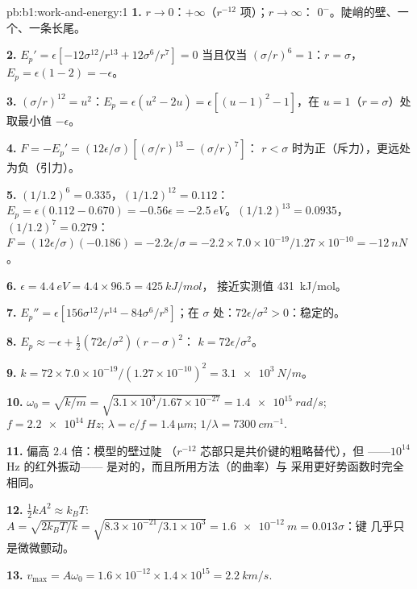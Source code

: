 \begin{solution}{pb:b1:work-and-energy:1}
\textbf{1.} $r \to 0$：$+\infty$（$r^{-12}$ 项）；$r \to \infty$：
$0^-$。陡峭的壁、一个、一条长尾。

\textbf{2.} $E_p' = \epsilon[-12\sigma^{12}/r^{13} + 12\sigma^6/r^7] = 0$ 当且仅当
$(\sigma/r)^6 = 1$：$r = \sigma$，$E_p = \epsilon(1 - 2) = -\epsilon$。

\textbf{3.} $(\sigma/r)^{12} = u^2$：$E_p = \epsilon(u^2 - 2u) = \epsilon[(u - 1)^2
- 1]$，在 $u = 1$（$r = \sigma$）处取最小值 $-\epsilon$。

\textbf{4.} $F = -E_p' = (12\epsilon/\sigma)[(\sigma/r)^{13} - (\sigma/r)^7]$：
$r < \sigma$ 时为正（斥力），更远处为负（引力）。

\textbf{5.} $(1/1.2)^6 = 0.335$，$(1/1.2)^{12} = 0.112$：$E_p = \epsilon(0.112
- 0.670) = -0.56\epsilon = \qty{-2.5}{eV}$。$(1/1.2)^{13} = 0.0935$，
$(1/1.2)^7 = 0.279$：$F = (12\epsilon/\sigma)(-0.186) = -2.2\epsilon/\sigma =
-2.2 \times 7.0\times10^{-19}/1.27\times10^{-10} = \qty{-12}{nN}$。

\textbf{6.} $\epsilon = \qty{4.4}{eV} = 4.4 \times 96.5 = \qty{425}{kJ/mol}$，
接近实测值 \qty{431}{kJ/mol}。

\textbf{7.} $E_p'' = \epsilon[156\sigma^{12}/r^{14} - 84\sigma^6/r^8]$；在
$\sigma$ 处：$72\epsilon/\sigma^2 > 0$：稳定的。

\textbf{8.} $E_p \approx -\epsilon + \tfrac12(72\epsilon/\sigma^2)(r - \sigma)^2$：
$k = 72\epsilon/\sigma^2$。

\textbf{9.} $k = 72 \times 7.0\times10^{-19}/(1.27\times10^{-10})^2 =
\qty{3.1e3}{N/m}$。

\textbf{10.} $\omega_0 = \sqrt{k/m} = \sqrt{3.1\times10^3/1.67\times10^{-27}} =
\qty{1.4e15}{rad/s}$; $f = \qty{2.2e14}{Hz}$; $\lambda = c/f = \qty{1.4}{\micro m}$;
$1/\lambda = \qty{7300}{cm^{-1}}$.

\textbf{11.} 偏高 $2.4$ 倍：模型的壁过陡
（$r^{-12}$ 芯部只是共价键的粗略替代），但
——$10^{14}$ Hz 的红外振动——
是对的，而且所用方法（的曲率）与
采用更好势函数时完全相同。

\textbf{12.} $\tfrac12 kA^2 \approx k_BT$: $A = \sqrt{2k_BT/k} = \sqrt{8.3\times
10^{-21}/3.1\times10^3} = \qty{1.6e-12}{m} = 0.013\sigma$：键
几乎只是微微颤动。

\textbf{13.} $v_{\max} = A\omega_0 = 1.6\times10^{-12} \times 1.4\times10^{15}
= \qty{2.2}{km/s}$.


\end{solution}
